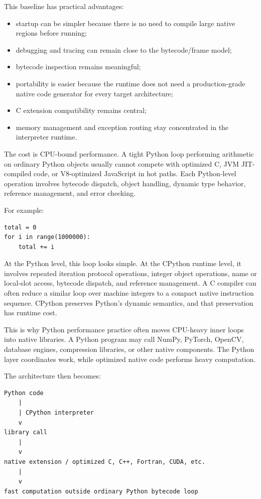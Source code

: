 This baseline has practical advantages:

\begin{itemize}
    \item startup can be simpler because there is no need to compile large native regions before running;
    \item debugging and tracing can remain close to the bytecode/frame model;
    \item bytecode inspection remains meaningful;
    \item portability is easier because the runtime does not need a production-grade native code generator for every target architecture;
    \item C extension compatibility remains central;
    \item memory management and exception routing stay concentrated in the interpreter runtime.
\end{itemize}

The cost is CPU-bound performance. A tight Python loop performing arithmetic on ordinary Python objects usually cannot compete with optimized C, JVM JIT-compiled code, or V8-optimized JavaScript in hot paths. Each Python-level operation involves bytecode dispatch, object handling, dynamic type behavior, reference management, and error checking.

For example:

\begin{verbatim}
total = 0
for i in range(1000000):
    total += i
\end{verbatim}

At the Python level, this loop looks simple. At the CPython runtime level, it involves repeated iteration protocol operations, integer object operations, name or local-slot access, bytecode dispatch, and reference management. A C compiler can often reduce a similar loop over machine integers to a compact native instruction sequence. CPython preserves Python's dynamic semantics, and that preservation has runtime cost.

This is why Python performance practice often moves CPU-heavy inner loops into native libraries. A Python program may call NumPy, PyTorch, OpenCV, database engines, compression libraries, or other native components. The Python layer coordinates work, while optimized native code performs heavy computation.

The architecture then becomes:

\begin{verbatim}
Python code
    |
    | CPython interpreter
    v
library call
    |
    v
native extension / optimized C, C++, Fortran, CUDA, etc.
    |
    v
fast computation outside ordinary Python bytecode loop
\end{verbatim}

